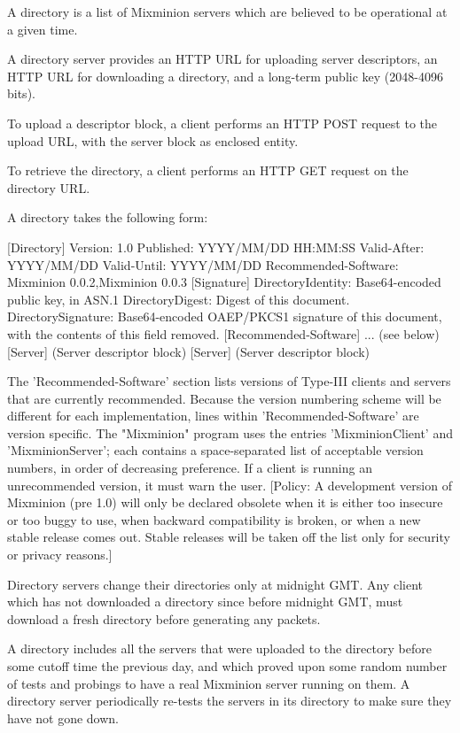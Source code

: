 A directory is a list of Mixminion servers which are believed to
be operational at a given time.

A directory server provides an HTTP URL for uploading server
descriptors, an HTTP URL for downloading a directory, and a long-term
public key (2048-4096 bits).

To upload a descriptor block, a client performs an HTTP POST request
to the upload URL, with the server block as enclosed entity.

To retrieve the directory, a client performs an HTTP GET request on
the directory URL.

A directory takes the following form:

 [Directory]
 Version: 1.0
 Published: YYYY/MM/DD HH:MM:SS
 Valid-After: YYYY/MM/DD
 Valid-Until: YYYY/MM/DD
 Recommended-Software: Mixminion 0.0.2,Mixminion 0.0.3
 [Signature]
 DirectoryIdentity: Base64-encoded public key, in ASN.1
 DirectoryDigest: Digest of this document.
 DirectorySignature: Base64-encoded OAEP/PKCS1 signature of this document, with
     the contents of this field removed.
 [Recommended-Software]
 ... (see below)
 [Server]
     (Server descriptor block)
 [Server]
     (Server descriptor block)

The 'Recommended-Software' section lists versions of Type-III clients
and servers that are currently recommended.  Because the version
numbering scheme will be different for each implementation, lines
within 'Recommended-Software' are version specific.  The "Mixminion"
program uses the entries 'MixminionClient' and 'MixminionServer'; each
contains a space-separated list of acceptable version numbers, in
order of decreasing preference.  If a client is running an
unrecommended version, it must warn the user.  [Policy: A development
version of Mixminion (pre 1.0) will only be declared obsolete when it 
is either too insecure or too buggy to use, when backward
compatibility is broken, or when a new stable release comes out.
Stable releases will be taken off the list only for security or
privacy reasons.]

Directory servers change their directories only at midnight GMT.  Any
client which has not downloaded a directory since before midnight GMT,
must download a fresh directory before generating any packets.

A directory includes all the servers that were uploaded to the
directory before some cutoff time the previous day, and which proved
upon some random number of tests and probings to have a real Mixminion
server running on them.  A directory server periodically re-tests
the servers in its directory to make sure they have not gone down.

